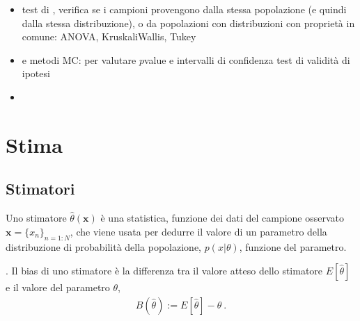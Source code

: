 \documentclass[letterpaper,10pt,italian]{jupyterBook}
\begin{document}
\begin{itemize}
\begin{itemize}
\item {} 
\sphinxAtStartPar
test di , verifica se i campioni provengono dalla stessa popolazione (e quindi dalla stessa distribuzione), o da popolazioni con distribuzioni con proprietà in comune: ANOVA, Kruskali\sphinxhyphen{}Wallis, Tukey

\item {} 
\sphinxAtStartPar
{} e metodi MC: per valutare \(p\)\sphinxhyphen{}value e intervalli di confidenza test di validità di ipotesi

\item {} 
\sphinxAtStartPar
{}

\end{itemize}

\end{itemize}





\sphinxstepscope


\section{Stima}
\label{\detokenize{ch/statistics/estimate:stima}}\label{\detokenize{ch/statistics/estimate:statistics-hs-inference-estimate}}\label{\detokenize{ch/statistics/estimate::doc}}

\subsection{Stimatori}
\label{\detokenize{ch/statistics/estimate:stimatori}}
\sphinxAtStartPar
Uno stimatore \(\hat{\theta}(\mathbf{x})\) è una statistica, funzione dei dati del campione osservato \(\mathbf{x} = \{ x_n \}_{n=1:N}\), che viene usata per dedurre il valore di un parametro della distribuzione di probabilità della popolazione, \(p(x|\theta)\), funzione del parametro.

\sphinxAtStartPar
{}. Il bias di uno stimatore è la differenza tra il valore atteso dello stimatore \(E[ \hat{\theta} ]\) e il valore del parametro \(\theta\),
\begin{equation*}
\begin{split}B(\hat{\theta}) := E[ \hat{\theta} ] - \theta \ .\end{split}
\end{equation*}
\end{document}
